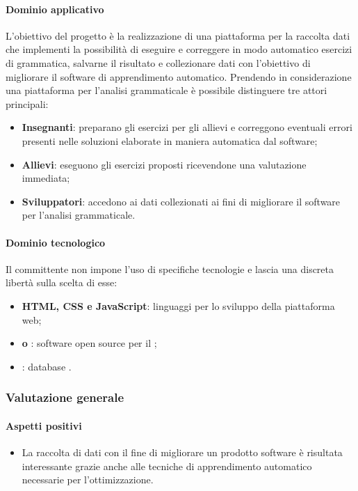 	\paragraph{Dominio applicativo} \Spazio
	L'obiettivo del progetto è la realizzazione di una piattaforma per la raccolta dati che implementi la possibilità di eseguire e correggere in modo automatico esercizi di grammatica, salvarne il risultato e collezionare dati con l'obiettivo di migliorare il software di apprendimento automatico.
	Prendendo in considerazione una piattaforma per l'analisi grammaticale è possibile distinguere tre attori principali:
	\begin{itemize} 
	\item \textbf{Insegnanti}: preparano gli esercizi per gli allievi e correggono eventuali errori presenti nelle soluzioni elaborate in maniera automatica dal software;
	\item \textbf{Allievi}: eseguono gli esercizi proposti ricevendone una valutazione immediata;
	\item \textbf{Sviluppatori}: accedono ai dati collezionati ai fini di migliorare il software per l'analisi grammaticale.
	\end{itemize}
	\paragraph{Dominio tecnologico} \Spazio
	Il committente non impone l'uso di specifiche tecnologie e lascia una discreta libertà sulla scelta di esse:
	\begin{itemize}
		\item \textbf{HTML, CSS e JavaScript}: linguaggi per lo sviluppo della piattaforma web;
		\item \textbf{ o }: software open source per il ;
		\item  \textbf{}: database .
	\end{itemize}
	\subsubsection{Valutazione generale}
	\paragraph{Aspetti positivi}
	\begin{itemize}
		\item {La raccolta di dati con il fine di migliorare un prodotto software è risultata interessante grazie anche alle tecniche di apprendimento automatico necessarie per l'ottimizzazione.}
	\end{itemize} 
